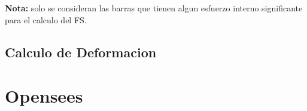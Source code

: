 \textbf{Nota:} solo se consideran las barras que tienen algun esfuerzo interno significante para el calculo del FS.


\subsection{Calculo de Deformacion}



\section{Opensees}



